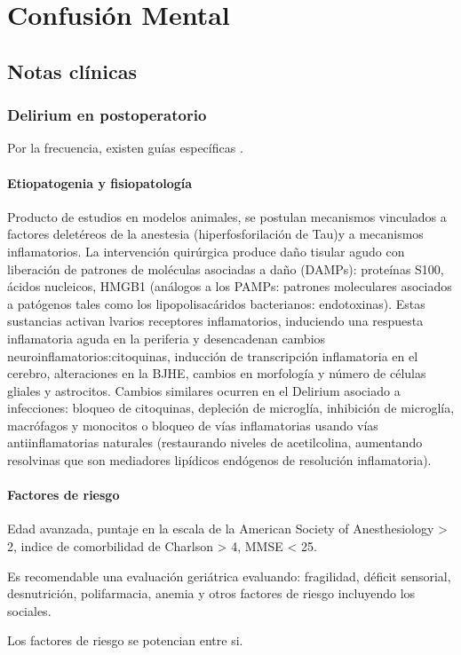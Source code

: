\chapter{Confusión Mental}
\section*{Notas clínicas}
\subsection*{Delirium en postoperatorio}
Por la frecuencia, existen guías específicas \cite{aldecoa2023update}.
\subsubsection*{Etiopatogenia y fisiopatología}
Producto de estudios en modelos animales, se postulan mecanismos vinculados a factores deletéreos de la anestesia (hiperfosforilación de Tau)y a mecanismos inflamatorios. La intervención quirúrgica produce daño tisular agudo con liberación de patrones de moléculas asociadas a daño (DAMPs): proteínas S100, ácidos nucleicos, HMGB1 (análogos a los PAMPs: patrones moleculares asociados a patógenos tales como los lipopolisacáridos bacterianos: endotoxinas). Estas sustancias activan lvarios receptores inflamatorios, induciendo una respuesta inflamatoria aguda en la periferia y desencadenan cambios neuroinflamatorios:citoquinas, inducción de transcripción inflamatoria en el cerebro, alteraciones en la BJHE, cambios en morfología y número de células gliales y astrocitos. 
Cambios similares ocurren en el Delirium asociado a infecciones: bloqueo de citoquinas, depleción de microglía, inhibición de microglía, macrófagos y monocitos o bloqueo de vías inflamatorias usando vías antiinflamatorias naturales (restaurando niveles de acetilcolina, aumentando resolvinas que son mediadores lipídicos endógenos de resolución inflamatoria). 
\subsubsection*{Factores de riesgo}
Edad avanzada, puntaje en la escala de la American Society of Anesthesiology > 2, indice de comorbilidad de Charlson > 4, MMSE < 25.

Es recomendable una evaluación geriátrica evaluando: fragilidad, déficit sensorial, desnutrición, polifarmacia, anemia y otros factores de riesgo incluyendo los sociales.

Los factores de riesgo se potencian entre si.
